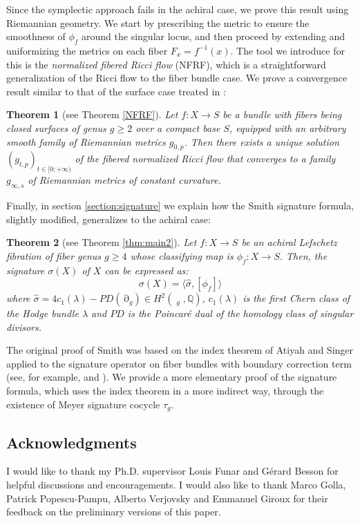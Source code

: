 \documentclass{article}
\DeclareMathOperator{\dm}{\overline{\mathcal{M}}}
\DeclareMathOperator{\sdiv}{\partial \dm}
\theoremstyle{plain}
\newtheorem{theorem}{Theorem}
\theoremstyle{remark}
\theoremstyle{definition}
\begin{document}
Since the symplectic approach fails in the achiral case, we prove this result using Riemannian geometry. We start by prescribing the metric to ensure the smoothness of $\phi_f$ around the singular locus, and then proceed by extending and uniformizing the metrics on each fiber $F_x= f^{-1}(x)$. The tool we introduce for this is the \emph{normalized fibered Ricci flow} (NFRF), which is a straightforward generalization of the Ricci flow to the fiber bundle case. We prove a convergence result similar to that of the surface case treated in \cite{Ham1}\thinspace:
\begin{theorem}[see Theorem \ref{NFRF}]
    Let $f:X\to S$ be a bundle with fibers being closed surfaces of genus $g\geq 2$ over a compact base $S$,
    equipped with an arbitrary smooth family of Riemannian metrics $g_{0,p}$. Then there exists a unique solution $(g_{t,p})_{t\in[0;+\infty)}$ of the fibered normalized Ricci flow that converges to a family $g_{\infty,s}$ of Riemannian metrics of constant curvature.
\end{theorem}
Finally, in section \ref{section:signature} we explain how the Smith signature formula, slightly modified, generalizes to the achiral case\thinspace:
\begin{theorem}[see Theorem \ref{thm:main2}]
    Let $f:X\to S$ be an achiral Lefschetz fibration of fiber genus $g\geq 4$ whose classifying map is $\phi_f : X\to S$. Then, the signature $\sigma(X)$ of $X$ can be expressed as\thinspace:
    $$\sigma(X) = \langle \hat\sigma, [\phi_f]\rangle$$
    where $\hat{\sigma} = 4c_1(\lambda)-PD(\sdiv_g)\in H^2(\dm_g,\mathbb{Q})$, $c_1(\lambda)$ is the first Chern class of the Hodge bundle $\lambda$ and $PD$ is the Poincar\'e dual of the homology class of singular divisors.
\end{theorem}
The original proof of Smith was based on the index theorem of Atiyah and Singer applied to the signature operator on fiber bundles with boundary correction term (see, for example, \cite{SignatureofFibreBundles} and \cite{spectralasymm}). We provide a more elementary proof of the signature formula, which uses the index theorem in a more indirect way, through the existence of Meyer signature cocycle $\tau_g$.
\subsection*{Acknowledgments}
I would like to thank my Ph.D. supervisor Louis Funar and Gérard Besson for helpful discussions and encouragements.
I would also like to thank Marco Golla, Patrick Popescu-Pampu, Alberto Verjovsky and Emmanuel Giroux for their feedback on the preliminary versions of this paper.
\end{document}
